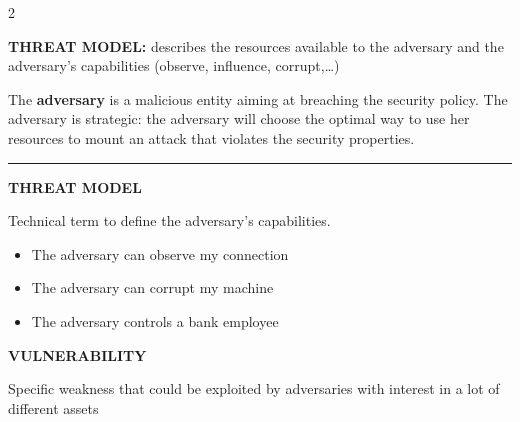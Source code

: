 \documentclass[a4paper,9pt]{extarticle}
\newcommand{\separator}{
\vspace{2pt}
\hrule
\vspace{3pt}
}
\begin{document}
\begin{multicols}{2}
\begin{definition}

\textbf{THREAT MODEL:} describes the resources available to the adversary and the adversary's capabilities (observe, influence, corrupt,\dots)

\end{definition}


\begin{definition}

The \textbf{adversary} is a malicious entity aiming at breaching the security policy. The adversary is strategic: the adversary will choose the optimal way to use her resources to mount an attack that violates the security properties.

\end{definition}


\separator


\begin{definition}

\textbf{THREAT MODEL}

Technical term to define the
adversary's capabilities.

\end{definition}


\begin{example}

\begin{itemize}

\item The adversary can observe my connection

\item The adversary can corrupt my machine

\item The adversary controls a bank employee

\end{itemize}

\end{example}


\begin{definition}

\textbf{VULNERABILITY}

Specific weakness that could be exploited by
adversaries with interest in a lot of different
assets

\end{definition}


\begin{example}

\begin{itemize}


\end{itemize}
\end{example}
\end{multicols}
\end{document}
